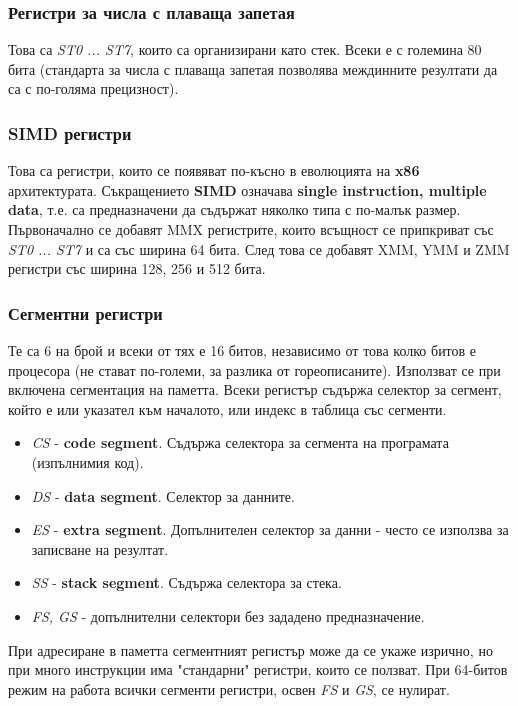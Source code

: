 \documentclass[fleqn,12pt]{article}
\begin{document}
\subsubsection{Регистри за числа с плаваща запетая}
Това са \textit{ST0 ... ST7}, които са организирани като стек. Всеки е с големина 80 бита (стандарта за числа с плаваща запетая позволява
междинните резултати да са с по-голяма прецизност).

\subsubsection{SIMD регистри}
Това са регистри, които се появяват по-късно в еволюцията на \textbf{x86} архитектурата. Съкращението \textbf{SIMD} означава \textbf{single instruction, multiple data}, т.е. са предназначени да съдържат няколко типа с по-малък размер. Първоначално се добавят MMX регистрите, които всъщност се припкриват със 
\textit{ST0 ... ST7} и са със ширина 64 бита. След това се добавят XMM, YMM и ZMM регистри със ширина 128, 256 и 512 бита.

\subsubsection{Сегментни регистри}
Те са 6 на брой и всеки от тях е 16 битов, независимо от това колко битов е процесора (не стават по-големи, за разлика от гореописаните).
Използват се при включена сегментация на паметта. Всеки регистър съдържа селектор за сегмент, който е или указател към началото, или индекс
в таблица със сегменти.
\begin{itemize}
    \item \textit{CS} - \textbf{code segment}. Съдържа селектора за сегмента на програмата (изпълнимия код).
    \item \textit{DS} - \textbf{data segment}. Селектор за данните.
    \item \textit{ES} - \textbf{extra segment}. Допълнителен селектор за данни - често се използва за записване на резултат.
    \item \textit{SS} - \textbf{stack segment}. Съдържа селектора за стека.
    \item \textit{FS, GS} - допълнителни селектори без зададено предназначение.
\end{itemize}

При адресиране в паметта сегментният регистър може да се укаже изрично, но при много инструкции има "стандарни" регистри, които се ползват.
При 64-битов режим на работа всички сегменти регистри, освен \textit{FS} и \textit{GS}, се нулират.
\end{document}
